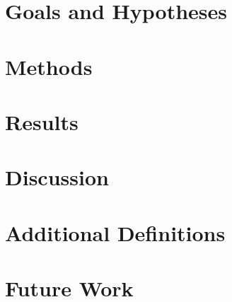 \documentclass{mtu.thesis}
\begin{document}
\chapter{Goals and Hypotheses}
\lipsum[1-20]

\chapter{Methods}
\lipsum[1-20]

\chapter{Results}
\lipsum[1-20]

\chapter{Discussion}
\lipsum[1-20]

%
%

\appendix

\chapter{Additional Definitions}
\lipsum[1-20]

\chapter{Future Work}
\lipsum[1-20]
\end{document}
